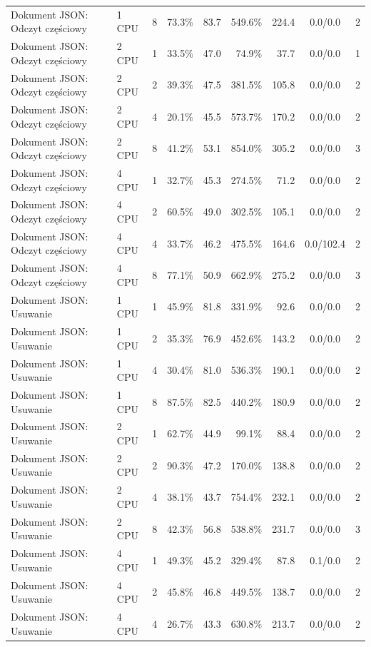 \begin{table}[ht]
{\begin{tabular}{llcrrrrcc}
Dokument JSON: Odczyt częściowy & 1 CPU & 8 & 73.3\% & 83.7 & 549.6\% & 224.4 & 0.0/0.0 & 2 \\
Dokument JSON: Odczyt częściowy & 2 CPU & 1 & 33.5\% & 47.0 & 74.9\% & 37.7 & 0.0/0.0 & 1 \\
Dokument JSON: Odczyt częściowy & 2 CPU & 2 & 39.3\% & 47.5 & 381.5\% & 105.8 & 0.0/0.0 & 2 \\
Dokument JSON: Odczyt częściowy & 2 CPU & 4 & 20.1\% & 45.5 & 573.7\% & 170.2 & 0.0/0.0 & 2 \\
Dokument JSON: Odczyt częściowy & 2 CPU & 8 & 41.2\% & 53.1 & 854.0\% & 305.2 & 0.0/0.0 & 3 \\
Dokument JSON: Odczyt częściowy & 4 CPU & 1 & 32.7\% & 45.3 & 274.5\% & 71.2 & 0.0/0.0 & 2 \\
Dokument JSON: Odczyt częściowy & 4 CPU & 2 & 60.5\% & 49.0 & 302.5\% & 105.1 & 0.0/0.0 & 2 \\
Dokument JSON: Odczyt częściowy & 4 CPU & 4 & 33.7\% & 46.2 & 475.5\% & 164.6 & 0.0/102.4 & 2 \\
Dokument JSON: Odczyt częściowy & 4 CPU & 8 & 77.1\% & 50.9 & 662.9\% & 275.2 & 0.0/0.0 & 3 \\
Dokument JSON: Usuwanie & 1 CPU & 1 & 45.9\% & 81.8 & 331.9\% & 92.6 & 0.0/0.0 & 2 \\
Dokument JSON: Usuwanie & 1 CPU & 2 & 35.3\% & 76.9 & 452.6\% & 143.2 & 0.0/0.0 & 2 \\
Dokument JSON: Usuwanie & 1 CPU & 4 & 30.4\% & 81.0 & 536.3\% & 190.1 & 0.0/0.0 & 2 \\
Dokument JSON: Usuwanie & 1 CPU & 8 & 87.5\% & 82.5 & 440.2\% & 180.9 & 0.0/0.0 & 2 \\
Dokument JSON: Usuwanie & 2 CPU & 1 & 62.7\% & 44.9 & 99.1\% & 88.4 & 0.0/0.0 & 2 \\
Dokument JSON: Usuwanie & 2 CPU & 2 & 90.3\% & 47.2 & 170.0\% & 138.8 & 0.0/0.0 & 2 \\
Dokument JSON: Usuwanie & 2 CPU & 4 & 38.1\% & 43.7 & 754.4\% & 232.1 & 0.0/0.0 & 2 \\
Dokument JSON: Usuwanie & 2 CPU & 8 & 42.3\% & 56.8 & 538.8\% & 231.7 & 0.0/0.0 & 3 \\
Dokument JSON: Usuwanie & 4 CPU & 1 & 49.3\% & 45.2 & 329.4\% & 87.8 & 0.1/0.0 & 2 \\
Dokument JSON: Usuwanie & 4 CPU & 2 & 45.8\% & 46.8 & 449.5\% & 138.7 & 0.0/0.0 & 2 \\
Dokument JSON: Usuwanie & 4 CPU & 4 & 26.7\% & 43.3 & 630.8\% & 213.7 & 0.0/0.0 & 2 \\

\end{tabular}}
\end{table}
